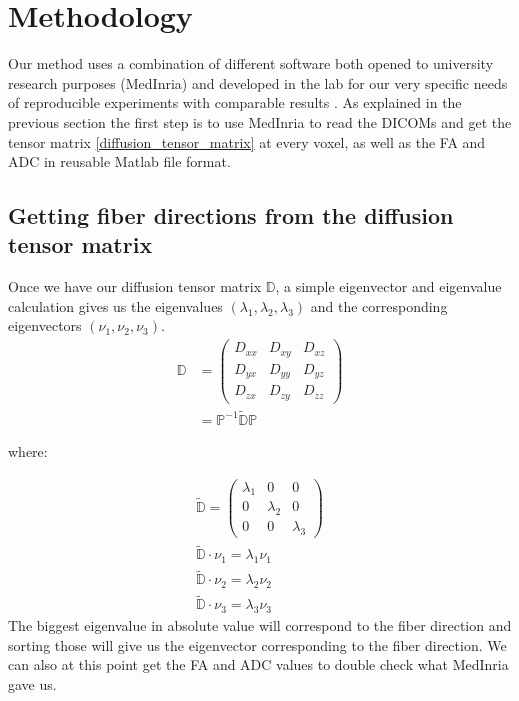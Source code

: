 \chapter{Methodology}

Our method uses a combination of different software both opened to university research purposes (MedInria) and developed in the lab for our very specific needs of reproducible experiments with comparable results \cite{piuzephd}. As explained in the previous section the first step is to use MedInria to read the DICOMs and get the tensor matrix \ref{diffusion_tensor_matrix} at every voxel, as well as the FA and ADC in reusable Matlab file format.

\section{Getting fiber directions from the diffusion tensor matrix}

Once we have our diffusion tensor matrix $\mathbb{D}$, a simple eigenvector and eigenvalue calculation gives us the eigenvalues $(\lambda_1, \lambda_2, \lambda_3)$ and the corresponding eigenvectors $(\nu_1, \nu_2, \nu_3)$.
\begin{align}
    \mathbb{D} &= \begin{pmatrix}
        D_{xx} & D_{xy} & D_{xz} \\
        D_{yx} & D_{yy} & D_{yz} \\
        D_{zx} & D_{zy} & D_{zz}
        \end{pmatrix} \\
    &= \mathbb{P}^{-1} \mathbb{\tilde{D}P}
\end{align}

where:

\begin{gather*}
    \mathbb{\tilde{D}} = \begin{pmatrix}
        \lambda_1 & 0 & 0 \\
        0 & \lambda_2 & 0 \\
        0 & 0 & \lambda_3
        \end{pmatrix} \\
    \mathbb{\tilde{D}}\cdot \nu_1 = \lambda_1 \nu_1 \\
    \mathbb{\tilde{D}}\cdot \nu_2 = \lambda_2 \nu_2 \\
    \mathbb{\tilde{D}}\cdot \nu_3 = \lambda_3 \nu_3
\end{gather*}
The biggest eigenvalue in absolute value will correspond to the fiber direction and sorting those will give us the eigenvector corresponding to the fiber direction. We can also at this point get the FA and ADC values to double check what MedInria gave us.

